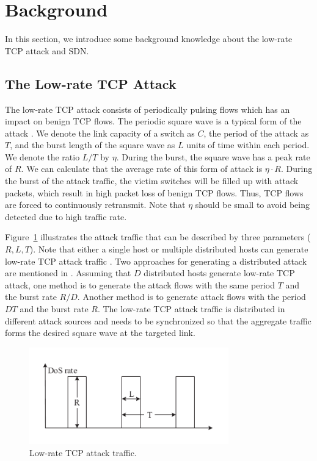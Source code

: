 \section{Background}
In this section, we introduce some background knowledge about the low-rate TCP attack and SDN.

\subsection{The Low-rate TCP Attack}
The low-rate TCP attack consists of periodically pulsing flows which has an impact on benign TCP flows. The periodic square wave is a typical form of the attack \cite{b20}. We denote the link capacity of a switch as $C$, the period of the attack as $T$, and the burst length of the square wave as $L$ units of time within each period. We denote the ratio $L / T$ by $\eta$. During the burst, the square wave has a peak rate of $R$. We can calculate that the average rate of this form of attack is $\eta \cdot R$. During the burst of the attack traffic, the victim switches will be filled up with attack packets, which result in high packet loss of benign TCP flows. Thus, TCP flows are forced to continuously retransmit. Note that $\eta$ should be small to avoid being detected due to high traffic rate.

Figure~\ref{fig:LDoS} illustrates the attack traffic that can be described by three parameters ($R, L, T$). Note that either a single host or multiple distributed hosts can generate low-rate TCP attack traffic \cite{b4}. Two approaches for generating a distributed attack are mentioned in \cite{b3}. Assuming that $D$ distributed hosts generate low-rate TCP attack, one method is to  generate the attack flows with the same period $T$ and the burst rate $R/D$. Another method is to generate attack flows with the period $DT$ and the burst rate $R$. The low-rate TCP attack traffic is distributed in different attack sources and needs to be synchronized so that the aggregate traffic forms the desired square wave at the targeted link. 

\begin{figure}
\vspace{-0.2in}
\centering
\includegraphics[width=3.4in]{Design/LDoS.pdf}
\vspace{-0.1in}
\caption{\small{Low-rate TCP attack traffic.}}
\label{fig:LDoS}
\vspace{-0.2in}
\end{figure}



